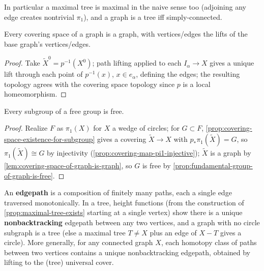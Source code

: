 In particular a maximal tree is maximal in the naive sense too (adjoining any edge
creates nontrivial $\pi_1$), and a graph is a tree iff simply-connected.

\begin{lemma}
\label{lem:covering-space-of-graph-is-graph}
Every covering space of a graph is a graph, with vertices/edges the lifts of the base
graph's vertices/edges.
\end{lemma}

\begin{proof}
Take $\tilde X^0 = p^{-1}(X^0)$; path lifting applied to each $I_\alpha\to X$ gives a unique
lift through each point of $p^{-1}(x)$, $x\in e_\alpha$, defining the edges; the resulting
topology agrees with the covering space topology since $p$ is a local homeomorphism.
\end{proof}

\begin{theorem}
\label{thm:subgroup-of-free-group-is-free}
Every subgroup of a free group is free.
\end{theorem}

\begin{proof}
Realize $F$ as $\pi_1(X)$ for $X$ a wedge of circles; for $G\subset F$,
\cref{prop:covering-space-existence-for-subgroup} gives a covering $\tilde X\to X$ with
$p_*\pi_1(\tilde X)=G$, so $\pi_1(\tilde X)\cong G$ by injectivity
(\cref{prop:covering-map-pi1-injective}); $\tilde X$ is a graph by
\cref{lem:covering-space-of-graph-is-graph}, so $G$ is free by
\cref{prop:fundamental-group-of-graph-is-free}.
\end{proof}

\begin{definition}[Edgepath]
\label{def:edgepath}
An \textbf{edgepath} is a composition of finitely many paths, each a single edge
traversed monotonically. In a tree, height functions (from the construction of
\cref{prop:maximal-tree-exists} starting at a single vertex) show there is a unique
\textbf{nonbacktracking} edgepath between any two vertices, and a graph with no
circle subgraph is a tree (else a maximal tree $T\ne X$ plus an edge of $X-T$ gives a
circle). More generally, for any connected graph $X$, each homotopy class of paths
between two vertices contains a unique nonbacktracking edgepath, obtained by
lifting to the (tree) universal cover.
\end{definition}

